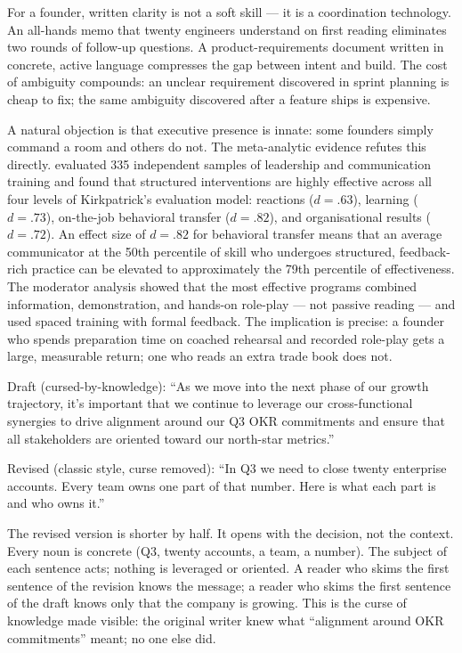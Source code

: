 For a founder, written clarity is not a soft skill — it is a coordination technology. An
all-hands memo that twenty engineers understand on first reading eliminates two rounds of
follow-up questions. A product-requirements document written in concrete, active language
compresses the gap between intent and build. The cost of ambiguity compounds: an unclear
requirement discovered in sprint planning is cheap to fix; the same ambiguity discovered
after a feature ships is expensive.

A natural objection is that executive presence is innate: some founders simply command a
room and others do not. The meta-analytic evidence refutes this directly.
\textcite{lacerenza2017training} evaluated 335 independent samples of leadership and
communication training and found that structured interventions are highly effective across
all four levels of Kirkpatrick's evaluation model: reactions (\(d = .63\)),
learning (\(d = .73\)), on-the-job behavioral transfer (\(d = .82\)), and organisational
results (\(d = .72\)). %
An effect size of \(d = .82\) for behavioral transfer means that an average communicator
at the 50th percentile of skill who undergoes structured, feedback-rich practice can
be elevated to approximately the 79th percentile of effectiveness. The moderator
analysis showed that the most effective programs combined information, demonstration, and
hands-on role-play — not passive reading — and used spaced training with formal feedback.
The implication is precise: a founder who spends preparation time on coached rehearsal
and recorded role-play gets a large, measurable return; one who reads an extra trade book
does not.

\begin{example}
Draft (cursed-by-knowledge): ``As we move into the next phase of our growth trajectory,
it's important that we continue to leverage our cross-functional synergies to drive
alignment around our Q3 OKR commitments and ensure that all stakeholders are oriented
toward our north-star metrics.''

Revised (classic style, curse removed): ``In Q3 we need to close twenty enterprise
accounts. Every team owns one part of that number. Here is what each part is and who
owns it.''

The revised version is shorter by half. It opens with the decision, not the context.
Every noun is concrete (Q3, twenty accounts, a team, a number). The subject of each
sentence acts; nothing is leveraged or oriented. A reader who skims the first sentence
of the revision knows the message; a reader who skims the first sentence of the draft
knows only that the company is growing. This is the curse of knowledge made visible:
the original writer knew what ``alignment around OKR commitments'' meant; no one else
did.
\end{example}

